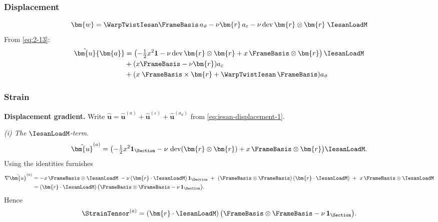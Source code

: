 \subsubsection{Displacement}
\[
\bm{w}=\WarpTwistIesan\FrameBasis  \, a_{\vartheta}-\nu\bm{r} \, a_{\varepsilon}
-\nu\operatorname{dev}\bm{r}\otimes\bm{r}\;\IesanLoadM
\]
From \eqref{eq:2-13}:
\begin{equation}
\begin{aligned}
    \hat{\bm{u}}\{\bm{a}\} &= \left(-\tfrac{1}{2}x^2 \mathbf{1} - \nu\operatorname{dev}\bm{r}\otimes\bm{r} + x\, \FrameBasis\otimes\bm{r}\right)\IesanLoadM
    \\ 
    &+ (x\FrameBasis - \nu \bm{r})a_{\varepsilon} \\
    &+(x\; \FrameBasis\times \bm{r} + \WarpTwistIesan\, \FrameBasis)a_{\vartheta}
\end{aligned}
\end{equation}

\subsubsection{Strain}




\textbf{Displacement gradient.}
Write \(\hat{\bm{u}}=\hat{\bm{u}}^{(a)}+\hat{\bm{u}}^{(\varepsilon)}+\hat{\bm{u}}^{(a_\vartheta)}\) from \eqref{eq:iesan-displacement-1}.

\medskip
\noindent\emph{(i) The \(\IesanLoadM\)-term.}
\[
\hat{\bm{u}}^{(a)}
=\bigl(-\tfrac12 x^2\mathbf{1}_\Section-\nu\,\operatorname{dev}(\bm{r}\otimes\bm{r})+x\,\FrameBasis\otimes\bm{r}\bigr)\IesanLoadM.
\]
Using the identities furnishes
\[
\begin{aligned}
\nabla\hat{\bm{u}}^{(a)}
&= -x\,\FrameBasis\otimes\IesanLoadM
\;-\nu\,(\bm{r}\cdot\IesanLoadM)\,\mathbf{1}_\Section
\;+\ (\FrameBasis\otimes\FrameBasis)\,(\bm{r}\cdot\IesanLoadM)
\;+\ x\,\FrameBasis\otimes\IesanLoadM\\
&=(\bm{r}\cdot\IesanLoadM)\,\big(\FrameBasis\otimes\FrameBasis-\nu\,\mathbf{1}_\Section\big).
\end{aligned}
\]
Hence
\begin{equation}
\StrainTensor^{(a)}
=(\bm{r}\cdot\IesanLoadM)\,\big(\FrameBasis\otimes\FrameBasis-\nu\,\mathbf{1}_\Section\big).
\label{eq:iesan-strain-tensor-bending}
\end{equation}

